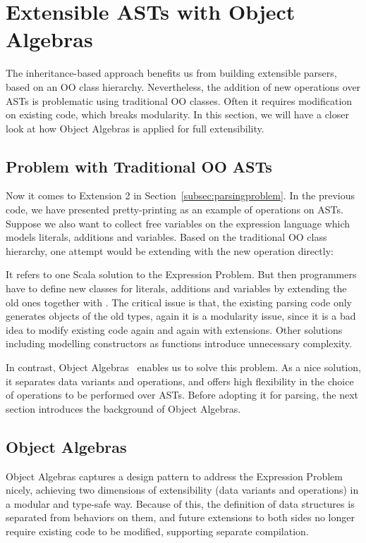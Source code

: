 \section{Extensible ASTs with Object Algebras}\label{sec:algebrasandparsing}

The inheritance-based approach benefits us from building extensible parsers, based on an OO class hierarchy.
Nevertheless, the addition of new operations over ASTs is problematic using traditional OO classes. Often it requires modification on existing code, which breaks modularity. In this section, we will have a closer look at how Object Algebras is applied for full extensibility.

\subsection{Problem with Traditional OO ASTs}\label{subsec:problemwithoutoa}

Now it comes to Extension 2 in Section~\ref{subsec:parsingproblem}. In the previous code, we have presented pretty-printing as
an example of operations on ASTs. Suppose we also want to collect free variables on the expression language which models
literals, additions and variables. Based on the traditional OO class hierarchy, one attempt would be extending  with the new
operation directly:


It refers to one Scala solution to the Expression Problem. But then programmers have to define new classes for literals, additions and variables
by extending the old ones together with . The critical issue is that, the existing parsing code only generates objects of the old
types, again it is a modularity issue, since it is a bad idea to modify existing code again and again with extensions. Other solutions including modelling constructors as functions introduce unnecessary complexity.

In contrast, Object Algebras~\cite{Oliveira2012} enables us to solve this problem. As a nice solution, it separates data variants
and operations, and offers high flexibility in the choice of operations to be performed over ASTs. Before adopting it for parsing, the next section introduces the background of Object Algebras.

\subsection{Object Algebras}\label{subsec:objectalgebras}
Object Algebras captures a design pattern to address the Expression Problem nicely,
achieving two dimensions of extensibility (data variants and operations) in a modular and type-safe way.
Because of this, the definition of data structures is separated from behaviors on them, and future extensions
to both sides no longer require existing code to be modified, supporting separate compilation.


